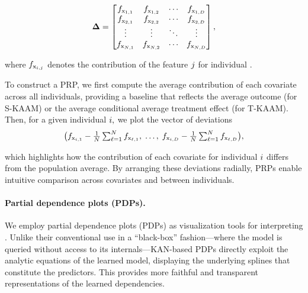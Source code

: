 \begin{equation}
\representationspace = 
    \begin{bmatrix}
\func[\covariate_{1,1}] & \func[\covariate_{1,2}] & \cdots & \func[\covariate_{1,\covsize}] \\
\func[\covariate_{2,1}] & \func[\covariate_{2,2}] & \cdots & \func[\covariate_{2,\covsize}] \\
\vdots & \vdots & \ddots & \vdots \\
\func[\covariate_{\samplesize,1}] & \func[\covariate_{\samplesize,2}] & \cdots & \func[\covariate_{\samplesize,\covsize}]
\end{bmatrix},
\end{equation}

where $\func[\covariate_{\indexone,\indextwo}]$ denotes the contribution of the feature $\indextwo$ for individual \indexone.  

To construct a PRP, we first compute the average contribution of each covariate across all individuals, providing a baseline that reflects the average outcome (for S-KAAM) or the average conditional average treatment effect (for T-KAAM). Then, for a given individual $\indexone,$ we plot the vector of deviations
\begin{equation}
    \big( \func[\covariate_{\indexone,1}] - \tfrac{1}{\samplesize}\textstyle\sum_{\ell=1}^{\samplesize}\func[\covariate_{\ell,1}], \; \ldots,\;
       \func[\covariate_{\indexone,\covsize}] - \tfrac{1}{\samplesize}\textstyle\sum_{\ell=1}^{\samplesize}\func[\covariate_{\ell,\covsize}] \big),
\end{equation}

which highlights how the contribution of each covariate for individual $\indexone$ differs from the population average. By arranging these deviations radially, PRPs enable intuitive comparison across covariates and between individuals.


\paragraph{Partial dependence plots (PDPs).}

We employ partial dependence plots (PDPs) \citep{friedman2001greedy} as visualization tools for interpreting \ours. Unlike their conventional use in a ``black-box'' fashion—where the model is queried without access to its internals—KAN-based PDPs \citep{pati25kaam} directly exploit the analytic equations of the learned model, displaying the underlying splines that constitute the predictors. This provides more faithful and transparent representations of the learned dependencies.  

